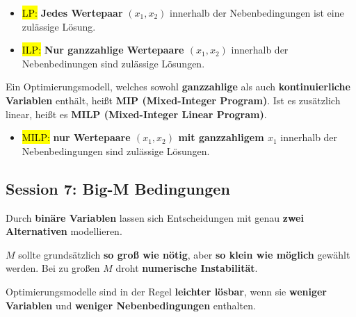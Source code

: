 \documentclass[a4paper, 10pt]{article}
\begin{document}
\begin{itemize}
    \item \hl{LP:} \textbf{Jedes Wertepaar} $(x_1, x_2)$ innerhalb der Nebenbedingungen ist eine zulässige Lösung.
    \item \hl{ILP:} \textbf{Nur ganzzahlige Wertepaare $(x_1, x_2)$} innerhalb der Nebenbedinungen sind zulässige Lösungen.
\end{itemize}

\noindent\begin{definitionbox}
    Ein Optimierungsmodell, welches sowohl \textbf{ganzzahlige} als auch \textbf{kontinuierliche
Variablen}  enthält, heißt \textbf{MIP (Mixed-Integer Program)}. Ist es zusätzlich linear,
heißt es \textbf{MILP (Mixed-Integer Linear Program)}.
\end{definitionbox}
\begin{itemize}
    \item \hl{MILP:} \textbf{nur Wertepaare $( x_1, x_2)$ mit ganzzahligem $x_1$} innerhalb der Nebenbedingungen sind zulässige Lösungen.
\end{itemize}

\subsection{Session 7: Big-M Bedingungen}

\begin{definitionbox}
    Durch \textbf{binäre Variablen} lassen sich Entscheidungen mit genau \textbf{zwei Alternativen} modellieren.
\end{definitionbox}
\begin{definitionbox}
    $M$ sollte grundsätzlich \textbf{so groß wie nötig}, aber \textbf{so klein wie möglich} gewählt werden. Bei zu großen $M$ droht \textbf{numerische Instabilität}.
\end{definitionbox}

\noindent\begin{definitionbox}
    Optimierungsmodelle sind in der Regel \textbf{leichter lösbar}, wenn sie
\textbf{weniger Variablen} und \textbf{weniger Nebenbedingungen} enthalten.
\end{definitionbox}
\end{document}
